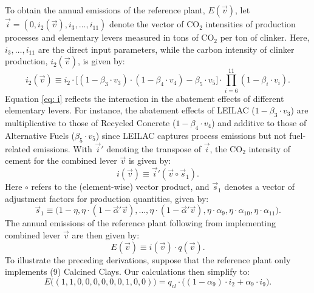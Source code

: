 \documentclass[12pt, a4paper]{article} %
\begin{document}
To obtain the annual emissions of the reference plant, $E(\vec{v})$, let $\vec{i} = (0, i_2(\vec{v}), i_3, \ldots, i_{11})$ denote the vector of CO$_2$ intensities of production processes and elementary levers measured in tons of CO$_2$ per ton of clinker. Here, $i_3, \ldots, i_{11}$ are the direct input parameters, while the carbon intensity of clinker production, $i_2(\vec{v})$, is given by:
\begin{equation}
\label{eq: i}
i_2(\vec{v}) \equiv i_2 \cdot \bigl[(1 - \beta_3 \cdot v_3) \cdot (1 - \beta_4 \cdot v_4) - \beta_5 \cdot v_5 \bigr] \cdot \prod\limits_{i=6}^{11} (1 - \beta_i \cdot v_i).
\end{equation}
Equation \eqref{eq: i} reflects the interaction in the abatement effects of different elementary levers. For instance, the abatement effects of LEILAC ($1 - \beta_3 \cdot v_3$) are multiplicative to those of Recycled Concrete ($1 - \beta_4 \cdot v_4$) and additive to those of Alternative Fuels ($\beta_5 \cdot v_5$) since LEILAC captures process emissions but not fuel-related emissions. With $\vec{i}'$ denoting the transpose of $\vec{i}$, the CO$_2$ intensity of cement for the combined lever $\vec{v}$ is given by:
\begin{equation}
i(\vec{v}) \equiv \vec{i}' (\vec{v} \circ \vec{s}_1).
\end{equation}
Here $\circ$ refers to the (element-wise) vector product, and $\vec{s}_1$ denotes a vector of adjustment factors for production quantities, given by:
$$\vec{s}_1 \equiv \bigl(1-\eta, \eta \cdot (1-\vec{\alpha}'\vec{v}), \ldots, \eta \cdot (1-\vec{\alpha}'\vec{v}), \eta \cdot \alpha_9, \eta \cdot \alpha_{10}, \eta \cdot \alpha_{11}\bigr).$$
The annual emissions of the reference plant following from implementing combined lever $\vec{v}$ are then given by:
\begin{equation}
E(\vec{v}) \equiv i(\vec{v}) \cdot q(\vec{v}).
\end{equation}
To illustrate the preceding derivations, suppose that the reference plant only implements (9) Calcined Clays. Our calculations then simplify to:
$$E\bigl((1, 1, 0, 0, 0, 0, 0, 0, 1, 0, 0)\big) = q_{cl} \cdot \bigl((1 - \alpha_{9}) \cdot i_2 + \alpha_9 \cdot i_9 \bigr).$$
\end{document}
